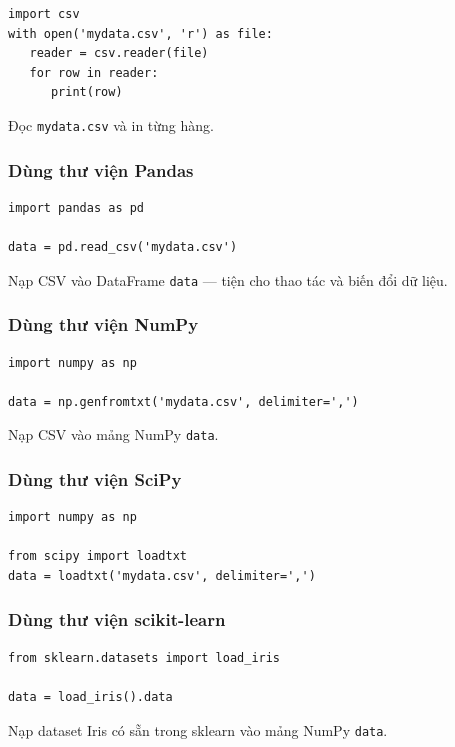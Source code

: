 \begin{vidu}[title={csv.reader}]
\begin{lstlisting}
import csv
with open('mydata.csv', 'r') as file:
   reader = csv.reader(file)
   for row in reader:
      print(row)
\end{lstlisting}
Đọc \texttt{mydata.csv} và in từng hàng.
\end{vidu}

\subsubsection{Dùng thư viện Pandas}

\begin{vidu}[title={pandas.read\_csv}]
\begin{lstlisting}
import pandas as pd

data = pd.read_csv('mydata.csv')
\end{lstlisting}
Nạp CSV vào DataFrame \texttt{data} --- tiện cho thao tác và biến đổi dữ liệu.
\end{vidu}

\subsubsection{Dùng thư viện NumPy}

\begin{vidu}[title={numpy.genfromtxt}]
\begin{lstlisting}
import numpy as np

data = np.genfromtxt('mydata.csv', delimiter=',')
\end{lstlisting}
Nạp CSV vào mảng NumPy \texttt{data}.
\end{vidu}

\subsubsection{Dùng thư viện SciPy}

\begin{vidu}[title={scipy loadtxt}]
\begin{lstlisting}
import numpy as np

from scipy import loadtxt
data = loadtxt('mydata.csv', delimiter=',')
\end{lstlisting}
\end{vidu}

\subsubsection{Dùng thư viện scikit-learn}

\begin{vidu}[title={load\_iris}]
\begin{lstlisting}
from sklearn.datasets import load_iris

data = load_iris().data
\end{lstlisting}
Nạp dataset Iris có sẵn trong sklearn vào mảng NumPy \texttt{data}.
\end{vidu}
